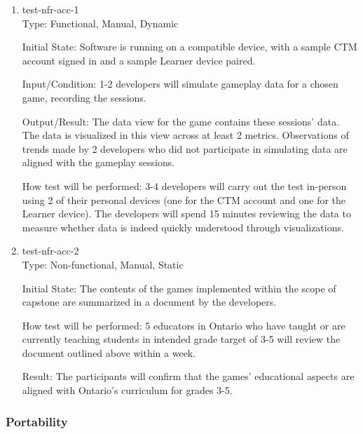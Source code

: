 \documentclass[12pt, titlepage]{article}
\begin{document}
\begin{enumerate}

\item\label{test-nfr-acc-1} test-nfr-acc-1\\

Type: Functional, Manual, Dynamic

Initial State: Software is running on a compatible device, with a sample CTM account signed in and a sample Learner device paired.
					
Input/Condition: 1-2 developers will simulate gameplay data for a chosen game, recording the sessions.

Output/Result: The data view for the game contains these sessions' data. The data is visualized in this view across at least 2 metrics. Observations of trends made by 2 developers who did not participate in simulating data are aligned with the gameplay sessions.
					
How test will be performed: 3-4 developers will carry out the test in-person using 2 of their personal devices (one for the CTM account and one for the Learner device). The developers will spend 15 minutes reviewing the data to measure whether data is indeed quickly understood through visualizations.

\item\label{test-nfr-acc-2} test-nfr-acc-2\\

Type: Non-functional, Manual, Static

Initial State: The contents of the games implemented within the scope of capstone are summarized in a document by the developers.

How test will be performed: 5 educators in Ontario who have taught or are currently teaching students in intended grade target of 3-5 will review the document outlined above within a week.

Result: The participants will confirm that the games' educational aspects are aligned with Ontario's curriculum for grades 3-5.
 
\end{enumerate}

\subsubsection{Portability}
\end{document}
